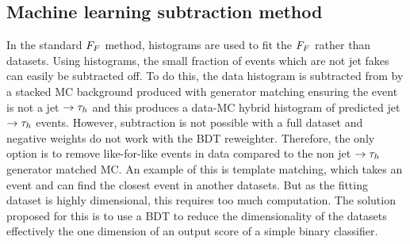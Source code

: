 \subsection{Machine learning subtraction method}

In the standard $F_{F}$ method, histograms are used to fit the $F_{F}$ rather than datasets. 
Using histograms, the small fraction of events which are not jet fakes can easily be subtracted off. 
To do this, the data histogram is subtracted from by a stacked \ac{MC} background produced with generator matching ensuring the event is not a jet $\rightarrow\tau_{h}$ and this produces a data-\ac{MC} hybrid histogram of predicted jet $\rightarrow\tau_{h}$ events.
However, subtraction is not possible with a full dataset and negative weights do not work with the \ac{BDT} reweighter. 
Therefore, the only option is to remove like-for-like events in data compared to the non jet $\rightarrow\tau_{h}$ generator matched MC.
An example of this is template matching, which takes an event and can find the closest event in another datasets.
But as the fitting dataset is highly dimensional, this requires too much computation.
The solution proposed for this is to use a \ac{BDT} to reduce the dimensionality of the datasets effectively the one dimension of an output score of a simple binary classifier. \\

